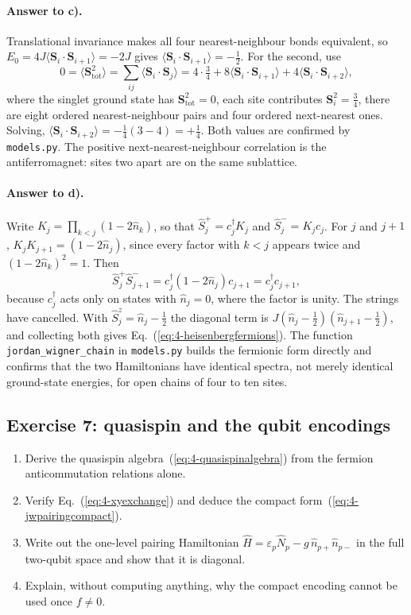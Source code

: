 \paragraph{Answer to c).}
Translational invariance makes all four nearest-neighbour bonds equivalent, so
$E_0=4J\langle\bm{S}_i\cdot\bm{S}_{i+1}\rangle=-2J$ gives
$\langle\bm{S}_i\cdot\bm{S}_{i+1}\rangle=-\tfrac12$.  For the second, use
\[
  0 = \langle\bm{S}^2_{\mathrm{tot}}\rangle
    = \sum_{ij}\langle\bm{S}_i\cdot\bm{S}_j\rangle
    = 4\cdot\tfrac34 + 8\langle\bm{S}_i\cdot\bm{S}_{i+1}\rangle
      + 4\langle\bm{S}_i\cdot\bm{S}_{i+2}\rangle ,
\]
where the singlet ground state has $\bm{S}^2_{\mathrm{tot}}=0$, each site
contributes $\bm{S}_i^2=\tfrac34$, there are eight ordered nearest-neighbour
pairs and four ordered next-nearest ones.  Solving,
$\langle\bm{S}_i\cdot\bm{S}_{i+2}\rangle
 = -\tfrac14(3-4)=+\tfrac14$.  Both values are confirmed by
\texttt{models.py}.  The positive next-nearest-neighbour correlation is the
antiferromagnet: sites two apart are on the same sublattice.

\paragraph{Answer to d).}
Write $K_j=\prod_{k<j}(1-2\hat{n}_k)$, so that
$\hat{S}^+_j=c^{\dagger}_jK_j$ and $\hat{S}^-_j=K_jc_j$.  For $j$ and $j+1$,
$K_jK_{j+1}=(1-2\hat{n}_j)$, since every factor with $k<j$ appears twice and
$(1-2\hat{n}_k)^2=1$.  Then
\[
  \hat{S}^+_j\hat{S}^-_{j+1}
   = c^{\dagger}_j(1-2\hat{n}_j)c_{j+1}
   = c^{\dagger}_jc_{j+1},
\]
because $c^{\dagger}_j$ acts only on states with $\hat{n}_j=0$, where the
factor is unity.  The strings have cancelled.  With
$\hat{S}^z_j=\hat{n}_j-\tfrac12$ the diagonal term is
$J(\hat{n}_j-\tfrac12)(\hat{n}_{j+1}-\tfrac12)$, and collecting both gives
Eq.~(\ref{eq:4-heisenbergfermions}).  The function
\texttt{jordan\_wigner\_chain} in \texttt{models.py} builds the fermionic form
directly and confirms that the two Hamiltonians have identical spectra, not
merely identical ground-state energies, for open chains of four to ten sites.

\subsection*{Exercise 7: quasispin and the qubit encodings}
\label{ex:4-quasispin}

\begin{enumerate}
  \item[a)] Derive the quasispin algebra~(\ref{eq:4-quasispinalgebra}) from
  the fermion anticommutation relations alone.
  \item[b)] Verify Eq.~(\ref{eq:4-xyexchange}) and deduce the compact
  form~(\ref{eq:4-jwpairingcompact}).
  \item[c)] Write out the one-level pairing Hamiltonian
  $\hat{H}=\varepsilon_p\hat{N}_p-g\,\hat{n}_{p+}\hat{n}_{p-}$ in the full
  two-qubit space and show that it is diagonal.
  \item[d)] Explain, without computing anything, why the compact encoding
  cannot be used once $f\ne0$.
\end{enumerate}

